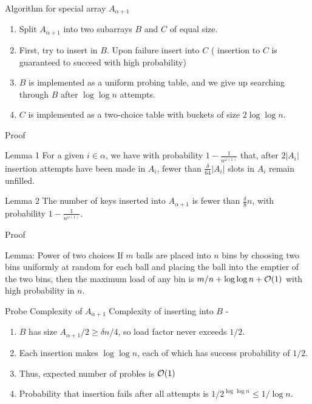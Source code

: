 \documentclass{beamer}
\begin{document}
\begin{frame}{Algorithm for special array $A_{\alpha + 1}$}
	\begin{enumerate}
		\item Split $A_{\alpha + 1}$ into two subarrays $B$ and $C$ of equal size. 
		\item First, try to insert in $B$. Upon failure insert into $C$ ( insertion to $C$ is guaranteed to succeed with high probability)
		\item $B$ is implemented as a uniform probing table, and we give up searching through $B$ after $\log{\log{n}}$ attempts.
		\item $C$ is implemented as a two-choice table with buckets of size $2\log{\log{n}}$. 
	\end{enumerate}
	
\end{frame}

\begin{frame}{Proof}
	\begin{block}{Lemma 1}
		For a given $i \in \alpha$, we have with probability $1 - \frac{1}{n^{\omega(1)}}$ that, after $2|A_i|$ insertion attempts have been made in $A_i$, fewer than $\frac{\delta}{64} |A_i|$ slots in $A_i$ remain unfilled.
	\end{block}

	\begin{block}{Lemma 2}
		The number of keys inserted into $A_{\alpha + 1}$ is fewer than $\frac{\delta}{8}n$, with probability $1 - \frac{1}{n^{\omega(1)}}$.
	\end{block}

\end{frame}


\begin{frame}{Proof}
	\begin{block}{Lemma: Power of two choices}
		If $m$ balls are placed into $n$ bins by choosing two bins uniformly at random for each ball and placing the ball into the emptier of the two bins, then the maximum load of any bin is $m/n + \log{\log{n}} + {\cal O}(1)$ with high probability in $n$.
	\end{block}
\end{frame}



\begin{frame}{Probe Complexity of $A_{\alpha + 1}$}
	Complexity of inserting into $B$ - 
	\begin{enumerate}
		\item $B$ has size $A_{\alpha + 1}/2 \ge \delta n/4$, so load factor never exceeds $1/2$. 
		\item Each insertion makes $\log{\log{n}}$, each of which has success probability of $1/2$. 
		\item Thus, expected number of probles is ${\cal O}(1)$
		\item Probability that insertion fails after all attempts is $1/2^{\log{\log{n}}} \le 1/ \log{n}$.
	\end{enumerate}
\end{frame}
\end{document}
